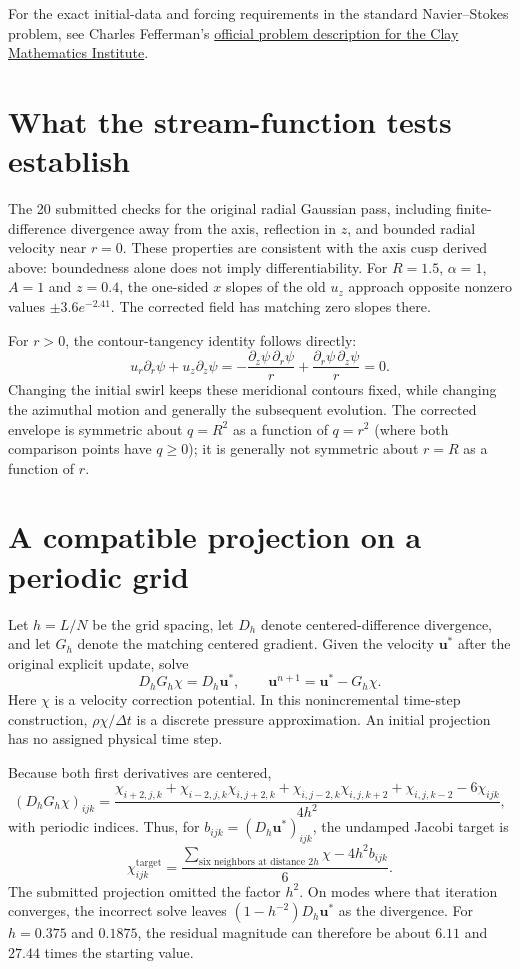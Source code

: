 \documentclass[11pt]{article}
\begin{document}
For the exact initial-data and forcing requirements in the standard
Navier--Stokes problem, see Charles Fefferman's
\href{https://www.claymath.org/library/monographs/MPPc.pdf}
{official problem description for the Clay Mathematics Institute}.

\section{What the stream-function tests establish}

The 20 submitted checks for the original radial Gaussian pass, including
finite-difference divergence away from the axis, reflection in $z$, and
bounded radial velocity near $r=0$. These properties are consistent with the
axis cusp derived above: boundedness alone does not imply differentiability.
For $R=1.5$, $\alpha=1$, $A=1$ and $z=0.4$, the one-sided $x$ slopes of the
old $u_z$ approach opposite nonzero values
$\pm 3.6e^{-2.41}$. The corrected field has matching zero slopes there.

For $r>0$, the contour-tangency identity follows directly:
\[
u_r\partial_r\psi+u_z\partial_z\psi
=-\frac{\partial_z\psi\,\partial_r\psi}{r}
 +\frac{\partial_r\psi\,\partial_z\psi}{r}=0.
\]
Changing the initial swirl keeps these meridional contours fixed, while
changing the azimuthal motion and generally the subsequent evolution.
The corrected envelope is symmetric about $q=R^2$ as a function of
$q=r^2$ (where both comparison points have $q\geq0$); it is generally
not symmetric about $r=R$ as a function of $r$.

\section{A compatible projection on a periodic grid}

Let $h=L/N$ be the grid spacing, let $D_h$ denote centered-difference
divergence, and let $G_h$ denote the matching centered gradient. Given
the velocity $\mathbf u^*$ after the original explicit update, solve
\[
D_hG_h\chi=D_h\mathbf u^*,\qquad
\mathbf u^{n+1}=\mathbf u^*-G_h\chi.
\]
Here $\chi$ is a velocity correction potential. In this nonincremental
time-step construction, $\rho\chi/\Delta t$ is a discrete pressure
approximation. An initial projection has no assigned physical time step.

Because both first derivatives are centered,
\[
(D_hG_h\chi)_{ijk}=
\frac{\chi_{i+2,j,k}+\chi_{i-2,j,k}
      \chi_{i,j+2,k}+\chi_{i,j-2,k}
      \chi_{i,j,k+2}+\chi_{i,j,k-2}
      -6\chi_{ijk}}{4h^2},
\]
with periodic indices. Thus, for $b_{ijk}=(D_h\mathbf u^*)_{ijk}$,
the undamped Jacobi target is
\[
\chi^{\mathrm{target}}_{ijk}
=\frac{\sum_{\text{six neighbors at distance }2h}\chi
       -4h^2b_{ijk}}{6}.
\]
The submitted projection omitted the factor $h^2$. On modes where that
iteration converges, the incorrect solve leaves
$(1-h^{-2})D_h\mathbf u^*$ as the divergence. For $h=0.375$ and $0.1875$,
the residual magnitude can therefore be about $6.11$ and $27.44$ times
the starting value.
\end{document}
